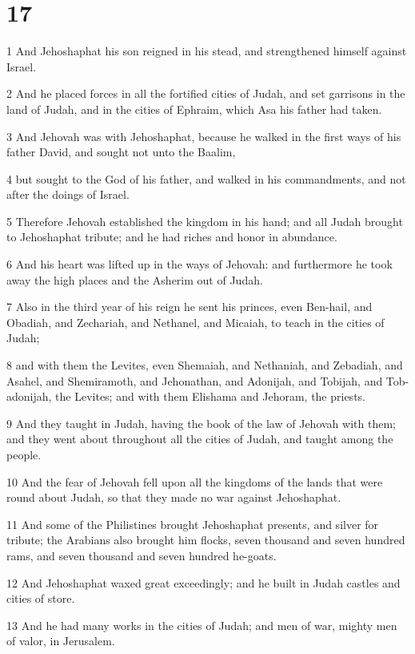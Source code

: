 \chapter{17}

\par 1 And Jehoshaphat his son reigned in his stead, and strengthened himself against Israel.
\par 2 And he placed forces in all the fortified cities of Judah, and set garrisons in the land of Judah, and in the cities of Ephraim, which Asa his father had taken.
\par 3 And Jehovah was with Jehoshaphat, because he walked in the first ways of his father David, and sought not unto the Baalim,
\par 4 but sought to the God of his father, and walked in his commandments, and not after the doings of Israel.
\par 5 Therefore Jehovah established the kingdom in his hand; and all Judah brought to Jehoshaphat tribute; and he had riches and honor in abundance.
\par 6 And his heart was lifted up in the ways of Jehovah: and furthermore he took away the high places and the Asherim out of Judah.
\par 7 Also in the third year of his reign he sent his princes, even Ben-hail, and Obadiah, and Zechariah, and Nethanel, and Micaiah, to teach in the cities of Judah;
\par 8 and with them the Levites, even Shemaiah, and Nethaniah, and Zebadiah, and Asahel, and Shemiramoth, and Jehonathan, and Adonijah, and Tobijah, and Tob-adonijah, the Levites; and with them Elishama and Jehoram, the priests.
\par 9 And they taught in Judah, having the book of the law of Jehovah with them; and they went about throughout all the cities of Judah, and taught among the people.
\par 10 And the fear of Jehovah fell upon all the kingdoms of the lands that were round about Judah, so that they made no war against Jehoshaphat.
\par 11 And some of the Philistines brought Jehoshaphat presents, and silver for tribute; the Arabians also brought him flocks, seven thousand and seven hundred rams, and seven thousand and seven hundred he-goats.
\par 12 And Jehoshaphat waxed great exceedingly; and he built in Judah castles and cities of store.
\par 13 And he had many works in the cities of Judah; and men of war, mighty men of valor, in Jerusalem.
